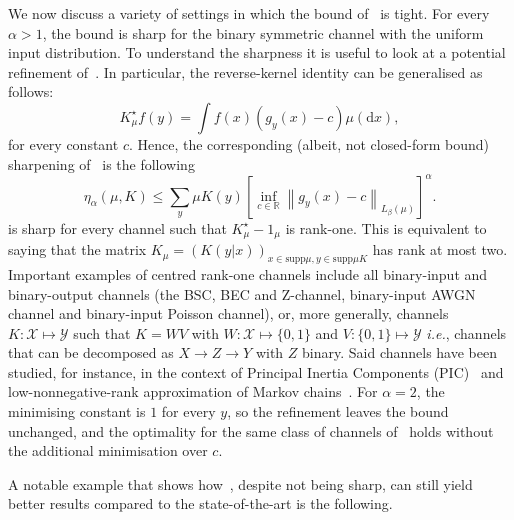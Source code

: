 \documentclass[11pt]{article}
\theoremstyle{plain}
\theoremstyle{remark}
\begin{document}
We now discuss a variety of settings in which the bound of~ is tight.
For every $\alpha>1$, the bound is sharp for the binary symmetric channel with the uniform input distribution. To understand the sharpness it is useful to look at a potential refinement of~.
In particular, the reverse-kernel identity can be generalised as follows:
\begin{equation}
    K_\mu^\star f(y) = \int f(x) (g_y(x)-c) \mu(\mathrm{d}x),
\end{equation}
for every constant $c$. 
Hence, the corresponding (albeit, not closed-form bound) sharpening of~ is the following
\begin{equation}
    \eta_\alpha(\mu, K) \leq \sum_y \mu K(y) \left[ \inf_{c\in \mathbb{R}}\left\lVert g_y(x)-c\right\rVert_{L_\beta(\mu)} \right]^\alpha. \label{eq:genCenteredBound}
\end{equation}
 is sharp for every channel such that $K_\mu^\star - 1_\mu$ is rank-one. This is equivalent to saying that the matrix $K_\mu = (K(y|x))_{x\in \text{supp}\mu , y \in \text{supp} \mu K}$ has rank at most two. Important examples of centred rank-one channels include all binary-input and binary-output channels (the BSC, BEC and Z-channel, binary-input AWGN channel and binary-input Poisson channel), or, more generally, channels $K: \mathcal{X} \mapsto \mathcal{Y}$ such that $K=WV$ with $W: \mathcal{X} \mapsto \{0,1\}$ and $V: \{0,1\} \mapsto \mathcal{Y}$ \textit{i.e.}, channels that can be decomposed as $X \rightarrow Z \rightarrow Y$ with $Z$ binary. Said channels have been studied, for instance, in the context of Principal Inertia Components (PIC)~\cite{Calmon2017PrincipalInertia} and low-nonnegative-rank approximation of Markov chains~\cite{Duan2020LowNonnegativeRank}.
For $\alpha=2$, the minimising constant is $1$ for every $y$, so the refinement leaves the bound unchanged, and the optimality for the same class of channels of~ holds without the additional minimisation over $c$. 

A notable example that shows how~, despite not being sharp, can still yield better results compared to the state-of-the-art is the following.
  
\end{document}
